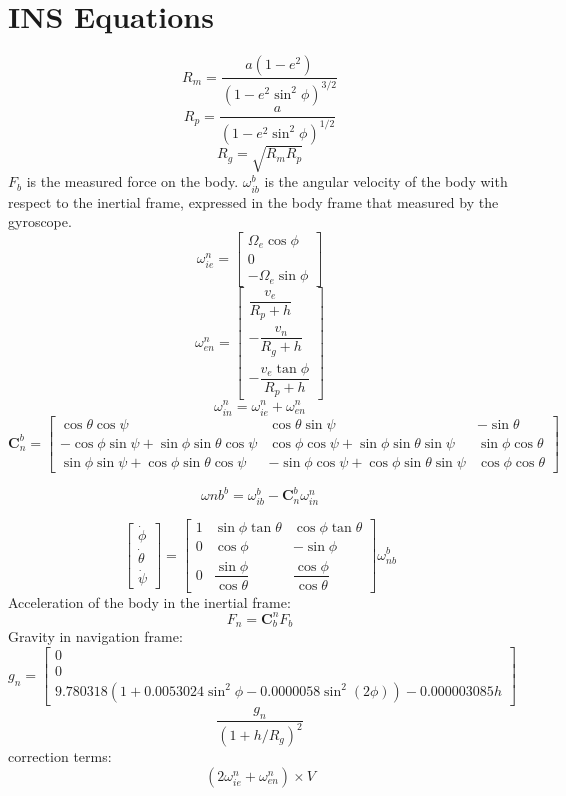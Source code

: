 \section{INS Equations}
\[
R_m = \dfrac{a(1-e^2)}{(1-e^2\sin^2\phi)^{3/2}}
\]
\[
    R_p = \dfrac{a}{(1-e^2\sin^2\phi)^{1/2}}
\]
\[
    R_g = \sqrt{R_m R_p}
\]
$F_b$ is the measured force on the body.
$\omega_{ib}^b$ is the angular velocity of the body with respect to the inertial frame, expressed in the body frame that measured by the gyroscope.
\[
    \omega_{ie}^n = \begin{bmatrix}
        \Omega_e \cos\phi \\
        0 \\
        -\Omega_e \sin\phi
    \end{bmatrix}
\]
\[
    \omega_{en}^n = \begin{bmatrix}
        \dfrac{v_e}{R_p+h} \\[1em]
        -\dfrac{v_n}{R_g+h} \\[1em]
        -\dfrac{v_e\tan\phi}{R_p+h}
    \end{bmatrix}
\]
\[
    \omega_{in}^n = \omega_{ie}^n + \omega_{en}^n
\]
\[
    \bm{C}_n^b = \begin{bmatrix}
        \cos\theta\cos\psi & \cos\theta\sin\psi & -\sin\theta \\
        -\cos\phi\sin\psi+\sin\phi\sin\theta\cos\psi & \cos\phi\cos\psi+\sin\phi\sin\theta\sin\psi & \sin\phi\cos\theta \\
        \sin\phi\sin\psi+\cos\phi\sin\theta\cos\psi & -\sin\phi\cos\psi+\cos\phi\sin\theta\sin\psi & \cos\phi\cos\theta
    \end{bmatrix}
\]

\[
    \omega{nb}^b = \omega_{ib}^b - \bm{C}_n^b \omega_{in}^n
\]

\[
    \begin{bmatrix}
        \dot{\phi} \\
        \dot{\theta} \\
        \dot{\psi}
    \end{bmatrix} = \begin{bmatrix}
        1 & \sin\phi\tan\theta & \cos\phi\tan\theta \\
        0 & \cos\phi & -\sin\phi \\
        0 & \dfrac{\sin\phi}{\cos\theta} & \dfrac{\cos\phi}{\cos\theta}
    \end{bmatrix} \omega_{nb}^b
\]
Acceleration of the body in the inertial frame:
\[
    F_n = \bm{C}_b^n F_b
\]
Gravity in navigation frame:
\[
    g_n = \begin{bmatrix}
        0 \\
        0 \\
        9.780318(1+0.0053024\sin^2\phi-0.0000058\sin^2(2\phi)) - 0.000003085h
    \end{bmatrix}
\]
\[
    \dfrac{g_n}{(1 + h/R_g)^2} 
\]
correction terms:
\[
    (2\omega_{ie}^n + \omega_{en}^n) \times V
\]

